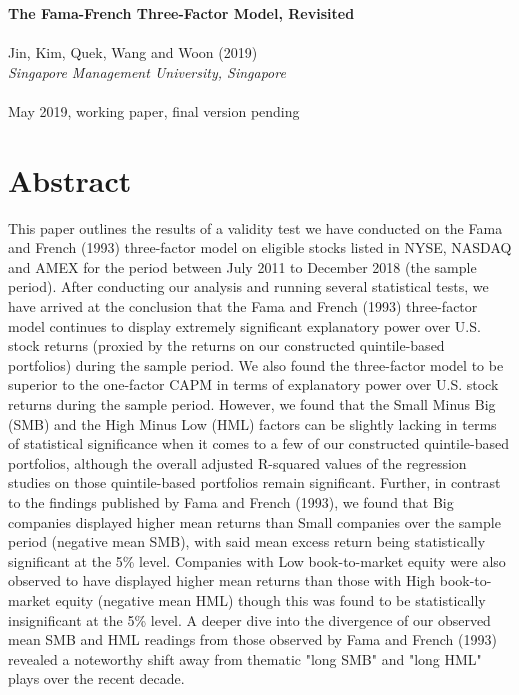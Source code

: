 \documentclass[12pt]{article}
\begin{document}
	\thispagestyle{plain}
	\noindent \Large \textbf{The Fama-French Three-Factor Model, Revisited}\\ \\
	\noindent Jin, Kim, Quek, Wang and Woon (2019)\\
	\noindent \normalsize \textit{Singapore Management University, Singapore}\\ \\
	\noindent May 2019, working paper, final version pending
	
		\section{Abstract} %
	
		This paper outlines the results of a validity test we have conducted on the Fama and French (1993) three-factor model on eligible stocks listed in NYSE, NASDAQ and AMEX for the period between July 2011 to December 2018 (the sample period). After conducting our analysis and running several statistical tests, we have arrived at the conclusion that the Fama and French (1993) three-factor model continues to display extremely significant explanatory power over U.S. stock returns (proxied by the returns on our constructed quintile-based portfolios) during the sample period. We also found the three-factor model to be superior to the one-factor CAPM in terms of explanatory power over U.S. stock returns during the sample period. However, we found that the Small Minus Big (SMB) and the High Minus Low (HML) factors can be slightly lacking in terms of statistical significance when it comes to a few of our constructed quintile-based portfolios, although the overall adjusted R-squared values of the regression studies on those quintile-based portfolios remain significant. Further, in contrast to the findings published by Fama and French (1993), we found that Big companies displayed higher mean returns than Small companies over the sample period (negative mean SMB), with said mean excess return being statistically significant at the 5\% level. Companies with Low book-to-market equity were also observed to have displayed higher mean returns than those with High book-to-market equity (negative mean HML) though this was found to be statistically insignificant at the 5\% level. A deeper dive into the divergence of our observed mean SMB and HML readings from those observed by Fama and French (1993) revealed a noteworthy shift away from thematic "long SMB" and "long HML" plays over the recent decade.
	
\end{document}
